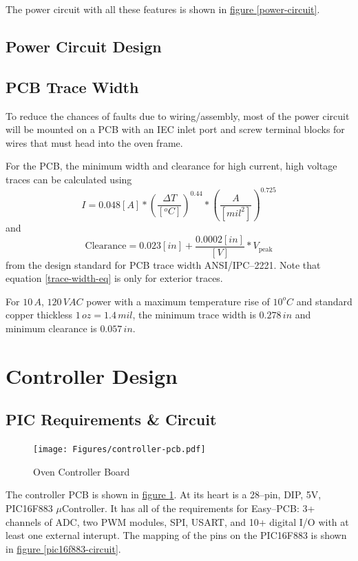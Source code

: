 \documentclass[10pt, twocolumn]{article}
\begin{document}
The power circuit with all these features is shown in
\hyperref[power-circuit]{figure \ref{power-circuit}}.

\subsection{Power Circuit Design}

\subsection{PCB Trace Width}

To reduce the chances of faults due to wiring/assembly, most of the power
circuit will be mounted on a PCB with an IEC inlet port and screw terminal
blocks for wires that must head into the oven frame.

For the PCB, the minimum width and clearance for high current,
high voltage traces can be calculated using
\begin{equation}
I=0.048[A]*\left(\frac{\Delta T}{[^{o}C]}\right)^{0.44}*\left(\frac{A}{[mil^{2}]}\right)^{0.725}
\label{trace-width-eq}
\end{equation}
and
\begin{equation}
\textrm{Clearance}=0.023[in]+\frac{0.0002[in]}{[V]}*V_{\textrm{peak}}
\end{equation}
from the design standard for PCB trace width ANSI/IPC--2221. Note that
equation \ref{trace-width-eq} is only for exterior traces.

For $10\,A$, $120\,VAC$ power with a maximum temperature rise of $10^{o}C$
and standard copper thickless $1\,oz=1.4\,mil$, the minimum trace width
is $0.278\,in$ and minimum clearance is $0.057\,in$.

\section{Controller Design}
\label{controller-section}

\subsection{PIC Requirements \& Circuit}

\begin{figure}
	\centering
	\texttt{[image: Figures/controller-pcb.pdf]}
	\caption{Oven Controller Board}
	\label{controller-pcb}
\end{figure}

The controller PCB is shown in
\hyperref[controller-pcb]{figure \ref{controller-pcb}}.
At its heart is a 28--pin, DIP, 5V, \textrm{PIC16F883} $\mu$Controller.
It has all of the requirements for  \textrm{Easy--PCB}:
3+ channels of ADC, two PWM modules, SPI, USART, and 10+
digital I/O with at least one external interupt.
The mapping of the pins on the \textrm{PIC16F883} is shown in
\hyperref[pic16f883-circuit]{figure \ref{pic16f883-circuit}}.
\end{document}
